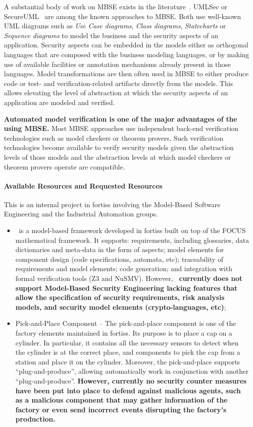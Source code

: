 A substantial body of work on MBSE exists in the literature~\cite{advancesmds}.
UMLSec or SecureUML~\cite{umlsec,secureuml} are among the known approaches
to MBSE. Both use well-known UML diagrams such as \emph{Use Case diagrams},
\emph{Class diagrams}, \emph{Statecharts} or \emph{Sequence diagrams} to model
the business and the security aspects of an application. Security aspects can be embedded in the models either as orthogonal
languages that are composed with the business modeling languages, or by making
use of available facilities or annotation mechanisms already present in those
languages. Model transformations are then often used in MBSE to either produce
code or test- and verification-related artifacts directly from the models. This
allows elevating the level of abstraction at which the security aspects of an
application are modeled and verified.

\textbf{Automated model verification is one of the major advantages of the using MBSE.}
Most MBSE approaches use independent back-end verification technologies such as
model checkers or theorem provers. Such verification technologies become available to
verify security models given the abstraction levels of those models and the
abstraction levels at which model checkers or theorem provers operate are
compatible.

\paragraph{Available Resources and Requested Resources} 
This is an internal project in fortiss involving the Model-Based Software Engineering and the Industrial Automation groups. 
\begin{itemize}
  \item \autofocus\ is a model-based framework developed in fortiss built on top of the FOCUS mathematical framework. It supports: requirements, including glossaries, data dictionaries and meta-data in the form of aspects; model elements for component design (code specifications, automata, etc); traceability of requirements and model elements; code generation; and integration with formal verification tools (Z3 and NuSMV). However, \textbf{\autofocus\ currently does not support Model-Based Security Engineering lacking features that allow the specification of security requirements, risk analysis models, and security model elements (crypto-languages, etc)};


  \item Pick-and-Place Component -- The pick-and-place component is one of the factory elements maintained in fortiss. Its purpose is to place a cap on a cylinder. In particular, it contains all the necessary sensors to detect when the cylinder is at the correct place, and components to pick the cap from a station and place it on the cylinder. Moreover, the pick-and-place supports ``plug-and-produce'', allowing automatically work in conjunction with another ``plug-and-produce''. \textbf{However, currently no security counter measures have been put into place to defend against malicious agents, such as a malicious component that may gather information of the factory or even send incorrect events disrupting the factory's production.}
\end{itemize}


